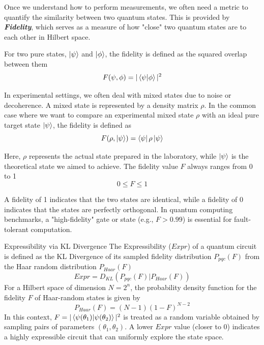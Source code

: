 \documentclass[11pt, letterpaper]{article}
\begin{document}
Once we understand how to perform measurements, we often need a metric to quantify the similarity between two quantum states. This is provided by \textbf{\textit{Fidelity}}, which serves as a measure of how "close" two quantum states are to each other in Hilbert space.

For two pure states, $\ket{\psi}$ and $\ket{\phi}$, the fidelity is defined as the squared overlap between them
\begin{equation}
  F(\psi, \phi) = |\braket{\psi|\phi}|^2
\end{equation}

In experimental settings, we often deal with mixed states due to noise or decoherence. A mixed state is represented by a density matrix $\rho$. In the common case where we want to compare an experimental mixed state $\rho$ with an ideal pure target state $\ket{\psi}$, the fidelity is defined as
\begin{equation}
  F(\rho, \ket{\psi}) = \bra{\psi}\rho\ket{\psi}
\end{equation}

Here, $\rho$ represents the actual state prepared in the laboratory, while $\ket{\psi}$ is the theoretical state we aimed to achieve. The fidelity value $F$ always ranges from 0 to 1
\begin{equation*}
  0 \le F \le 1
\end{equation*}

A fidelity of 1 indicates that the two states are identical, while a fidelity of 0 indicates that the states are perfectly orthogonal. In quantum computing benchmarks, a "high-fidelity" gate or state (e.g., $F > 0.99$) is essential for fault-tolerant computation.

\begin{SBUBox}{Expressibility via KL Divergence}
The Expressibility ($Expr$) of a quantum circuit is defined as the KL Divergence of its sampled fidelity distribution $P_{pqc}(F)$ from the Haar random distribution $P_{Haar}(F)$
\begin{equation*}
Expr = D_{KL} \left( P_{pqc}(F) | P_{Haar}(F) \right)
\end{equation*}
For a Hilbert space of dimension $N = 2^n$, the probability density function for the fidelity $F$ of Haar-random states is given by
\begin{equation*}
P_{Haar}(F) = (N - 1)(1 - F)^{N - 2}
\end{equation*}
In this context, $F = |\braket{\psi(\theta_1) | \psi(\theta_2)}|^2$ is treated as a random variable obtained by sampling pairs of parameters $(\theta_1, \theta_2)$. A lower $Expr$ value (closer to 0) indicates a highly expressible circuit that can uniformly explore the state space.
\end{SBUBox}
\end{document}
